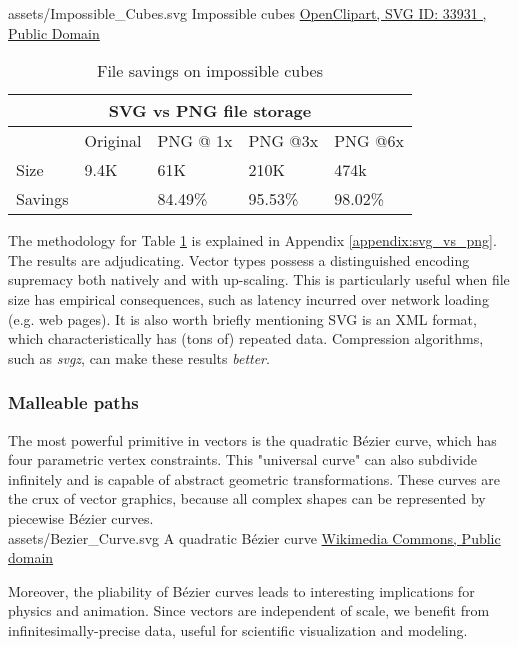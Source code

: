 \svg
{assets/Impossible_Cubes.svg}
{\label{fig:impossible_cubes}Impossible cubes}
{\href{https://freesvg.org/by/OpenClipart}{OpenClipart, SVG ID: 33931 , Public Domain}}

\clearpage

\begin{table}
\centering
\begin{tabular}{ |p{2cm}||p{2cm}|p{2cm}|p{2cm}|p{2cm}|  }
\hline
\multicolumn{5}{|c|}{SVG vs PNG file storage} \\
\hline
&Original&PNG @ 1x&PNG @3x&PNG @6x\\
\hline
Size&9.4K&61K&210K&474k\\
\hline
Savings&&84.49\%&95.53\%&98.02\%\\
\hline
\end{tabular}
\caption{\label{tab:impossible_cubes_stats}File savings on impossible cubes}
\end{table}

The methodology for Table \ref{tab:impossible_cubes_stats} is explained in Appendix \ref{appendix:svg_vs_png}. The results are adjudicating. Vector types possess a distinguished encoding supremacy both natively and with up-scaling. This is particularly useful when file size has empirical consequences, such as latency incurred over network loading (e.g. web pages). It is also worth briefly mentioning SVG is an XML format, which characteristically has (tons of) repeated data. Compression algorithms, such as \textit{svgz}, can make these results \emph{better}.\\

\subsubsection{Malleable paths}
The most powerful primitive in vectors is the quadratic Bézier curve, which has four parametric vertex constraints. This "universal curve" can also subdivide infinitely and is capable of abstract geometric transformations. These curves are the crux of vector graphics, because all complex shapes can be represented by piecewise Bézier curves.\\

\svg
{assets/Bezier_Curve.svg}
{A quadratic Bézier curve}
{\href{https://commons.wikimedia.org/wiki/File:Bezier_curve.svg}{Wikimedia Commons, Public domain}}
\label{fig:bezier_curve}

Moreover, the pliability of Bézier curves leads to interesting implications for physics and animation. Since vectors are independent of scale, we benefit from infinitesimally-precise data, useful for scientific visualization and modeling.\\
